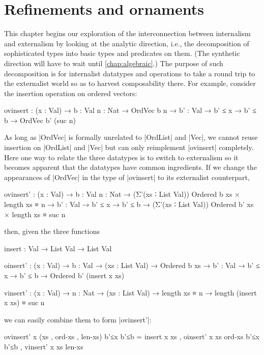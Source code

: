 \chapter{Refinements and ornaments}
\label{chap:refinements-and-ornaments}

This chapter begins our exploration of the interconnection between internalism and externalism by looking at the analytic direction, i.e., the decomposition of sophisticated types into basic types and predicates on them.
(The synthetic direction will have to wait until \autoref{chap:algebraic}.)
The purpose of such decomposition is for internalist datatypes and operations to take a round trip to the externalist world so as to harvest composability there.
For example, consider the insertion operation on ordered vectors:
\begin{code}
ovinsert :  (x : Val) → {b : Val} {n : Nat} → OrdVec b n →
            {b' : Val} → b' ≤ x → b' ≤ b → OrdVec b' (suc n)
\end{code}
As long as |OrdVec| is formally unrelated to |OrdList| and |Vec|, we cannot reuse insertion on |OrdList| and |Vec| but can only reimplement |ovinsert| completely.
Here one way to relate the three datatypes is to switch to externalism so it becomes apparent that the datatypes have common ingredients.
If we change the appearances of |OrdVec| in the type of |ovinsert| to its externalist counterpart,
\begin{code}
ovinsert' :  (x : Val) → {b : Val} {n : Nat} →
               (Σ'(xs ∶ List Val)) Ordered b xs × length xs ≡ n →
             {b' : Val} → b' ≤ x → b' ≤ b →
               (Σ'(xs ∶ List Val)) Ordered b' xs × length xs ≡ suc n
\end{code}
then, given the three functions
\begin{code}
insert    :  Val → List Val → List Val

oinsert'  :  (x : Val) → {b : Val} →
             (xs : List Val) → Ordered b xs →
             {b' : Val} → b' ≤ x → b' ≤ b → Ordered b' (insert x xs)

vinsert' :  (x : Val) → {n : Nat} →
            (xs : List Val) → length xs ≡ n →
            length (insert x xs) ≡ suc n
\end{code}
we can easily combine them to form |ovinsert'|:
\begin{code}
ovinsert' x (xs , ord-xs , len-xs) b'≤x b'≤b =  insert x xs ,
                                                oinsert' x xs ord-xs b'≤x b'≤b ,
                                                vinsert' x xs len-xs
\end{code}
